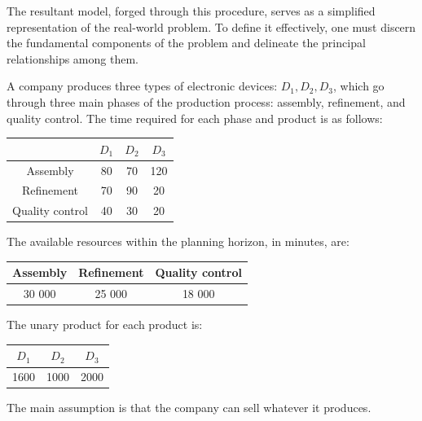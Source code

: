 \documentclass[12pt, a4paper]{report}
\begin{document}
    The resultant model, forged through this procedure, serves as a simplified representation of the real-world problem. 
    To define it effectively, one must discern the fundamental components of the problem and delineate the principal relationships among them.
    \begin{example}
        A company produces three types of electronic devices: $D_1,D_2,D_3$, which go through three main phases of the production process: assembly, refinement, and quality control.
        The time required for each phase and product is as follows:
        \begin{table}[H]
            \centering
            \begin{tabular}{c|ccc|}
            \cline{2-4}
            \textbf{}                             & \textbf{$D_1$} & \textbf{$D_2$} & $D_3$ \\ \hline
            \multicolumn{1}{|c|}{Assembly}        & 80             & 70             & 120   \\
            \multicolumn{1}{|c|}{Refinement}      & 70             & 90             & 20    \\
            \multicolumn{1}{|c|}{Quality control} & 40             & 30             & 20    \\ \hline
            \end{tabular}
        \end{table}
        The available resources within the planning horizon, in minutes, are:
        \begin{table}[H]
            \centering
            \begin{tabular}{|c|c|c|}
            \hline
            \textbf{Assembly} & \textbf{Refinement} & \textbf{Quality control} \\ \hline
            30 000            & 25 000              & 18 000                   \\ \hline
            \end{tabular}
        \end{table}
        The unary product for each product is: 
        \begin{table}[H]
            \centering
            \begin{tabular}{|c|c|c|}
            \hline
            $D_1$          & $D_2$          & $D_3$ \\ \hline
            1600           & 1000           & 2000  \\ \hline
            \end{tabular}
        \end{table}
        The main assumption is that the company can sell whatever it produces.


\end{example}
\end{document}
